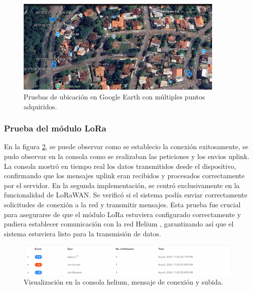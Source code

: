 \begin{figure}[H]
    \centering
    \includegraphics[width=0.9\textwidth]{./capitulo_05/imagen/variascoord.png}
    \caption{Pruebas de ubicación en Google Earth con múltiples puntos adquiridos.}
    \label{fig:multiple-puntos}
\end{figure}

\subsubsection{Prueba del módulo LoRa} 
En la figura \ref{fig:uplink}, se puede observar como se establecio la conexión exitosamente, se pudo observar en la consola como se realizaban las peticiones y los envios uplink. La consola mostró en tiempo real los datos transmitidos desde el dispositivo, confirmando que los mensajes uplink eran recibidos y procesados correctamente por el servidor.
En la segunda implementación, se centró exclusivamente en la funcionalidad de LoRaWAN. Se verificó si el sistema podía enviar correctamente solicitudes de conexión a la red y transmitir mensajes. Esta prueba fue crucial para asegurarse de que el módulo LoRa estuviera configurado correctamente y pudiera establecer comunicación con la red Helium \cite{Helium_Console}, garantizando así que el sistema estuviera listo para la transmisión de datos.

\begin{figure}[H]
\leavevmode
\begin{minipage}{\textwidth}
\begin{center}
\includegraphics[width=\textwidth]{./capitulo_05/imagen/uplink.png}
\caption{Visualización en la consola helium, mensaje de conexión y subida.\label{fig:uplink}}
\end{center}
\end{minipage}
\end{figure}

